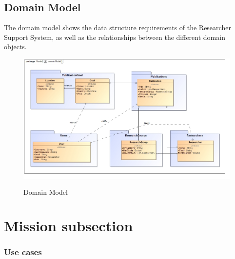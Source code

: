 \documentclass{article}
\begin{document}
	
	
\newpage

	\subsection{Domain Model}
	
	The domain model shows the data structure requirements of the Researcher Support System, as well as the relationships between the different domain objects. 

	\begin{figure}[H]
		\includegraphics[width=\textwidth]{domainModelB.jpg}  \\
		\caption{Domain Model}
	\end{figure}
	
\newpage

\section{Mission subsection}
\subsubsection{Use cases}
\end{document}
